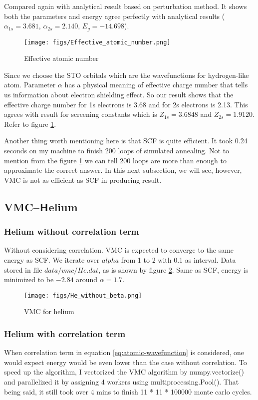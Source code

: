\documentclass[11pt]{article}
\begin{document}
Compared again with analytical result \cite{Be-perturbation} based on perturbation method. It shows both the parameters and energy agree perfectly with analytical results ($\alpha_{1s}=3.681$, $\alpha_{2s}=2.140$, $E_g=-14.698$). 

\begin{figure}[hbt!]
    \centering
    \texttt{[image: figs/Effective\_atomic\_number.png]}
    \caption{Effective atomic number}
    \label{fig:effective-atmoic-number}%
\end{figure}

Since we choose the STO orbitals which are the wavefunctions for hydrogen-like atom. Parameter $\alpha$ has a physical meaning of effective charge number that tells us information about electron shielding effect. So our result shows that the effective charge number for 1s electrons is 3.68 and for 2s electrons is 2.13. This agrees with result for screening constants \cite{screening-constants} which is $Z_{1s}=3.6848$ and $Z_{2s}=1.9120$. Refer to figure \ref{fig:effective-atmoic-number}. 

Another thing worth mentioning here is that SCF is quite efficient. It took 0.24 seconds on my machine to finish 200 loops of simulated annealing. Not to mention from the figure \ref{fig:effective-atmoic-number} we can tell 200 loops are more than enough to approximate the correct answer. In this next subsection, we will see, however, VMC is not as efficient as SCF in producing result. 

\subsection{VMC--Helium}
\subsubsection*{Helium without correlation term}
Without considering correlation. VMC is expected to converge to the same energy as SCF. We iterate over $alpha$ from 1 to 2 with 0.1 as interval. Data stored in file $data/vmc/He.dat$, as is shown by figure \ref{fig:vmc-he}. Same as SCF, energy is minimized to be $-2.84$ around $\alpha = 1.7$. 
\begin{figure}
    \centering
    \texttt{[image: figs/He\_without\_beta.png]}
    \caption{VMC for helium}
    \label{fig:vmc-he}%
\end{figure}
\subsubsection*{Helium with correlation term}
When correlation term in equation \ref{eq:atomic-wavefunction} is considered, one would expect energy would be even lower than the case without correlation. To speed up the algorithm, I vectorized the VMC algorithm by numpy.vectorize() and parallelized it by assigning 4 workers using multiprocessing.Pool(). That being said, it still took over 4 mins to finish 11 * 11 * 100000 monte carlo cycles. 
\end{document}
